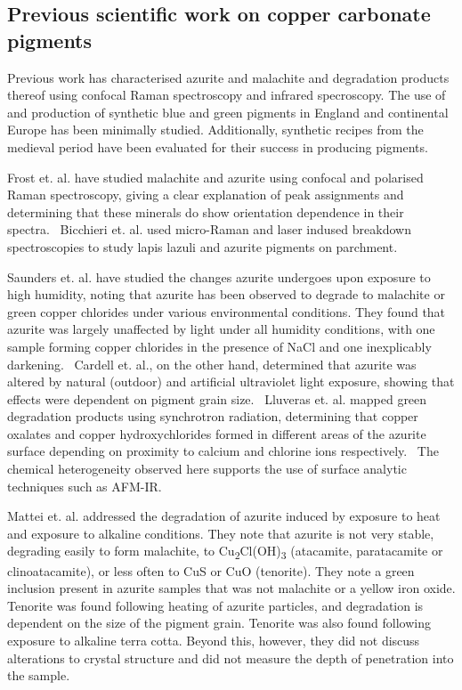 \subsection[Previous scientific work on copper carbonate pigments]{Previous scientific work on copper carbonate pigments}
\label{subsection1.1.5}

Previous work has characterised azurite and malachite and degradation products thereof using confocal Raman spectroscopy and infrared specroscopy. The use of and production of synthetic blue and green pigments in England and continental Europe has been minimally studied. Additionally, synthetic recipes from the medieval period have been evaluated for their success in producing pigments.

Frost et. al. have studied malachite and azurite using confocal and polarised Raman spectroscopy, giving a clear explanation of peak assignments and determining that these minerals do show orientation dependence in their spectra.~\autocite{Frost} Bicchieri et. al. used micro-Raman and laser indused breakdown spectroscopies to study lapis lazuli and azurite pigments on parchment.~\autocite{Bicchieri} 

Saunders et. al. have studied the changes azurite undergoes upon exposure to high humidity, noting that azurite has been observed to degrade to malachite or green copper chlorides under various environmental conditions. They found that azurite was largely unaffected by light under all humidity conditions, with one sample forming copper chlorides in the presence of NaCl and one inexplicably darkening.~\autocite{Saunders} Cardell et. al., on the other hand, determined that azurite was altered by natural (outdoor) and artificial ultraviolet light exposure, showing that effects were dependent on pigment grain size.~\autocite{Cardell} Lluveras et. al. mapped green degradation products using synchrotron radiation, determining that copper oxalates and copper hydroxychlorides formed in different areas of the azurite surface depending on proximity to calcium and chlorine ions respectively.~\autocite{Lluveras} The chemical heterogeneity observed here supports the use of surface analytic techniques such as AFM-IR. 

Mattei et. al. addressed the degradation of azurite induced by exposure to heat and exposure to alkaline conditions. They note that azurite is not very stable, degrading easily to form malachite, to Cu\textsubscript{2}Cl(OH)\textsubscript{3} (atacamite, paratacamite or clinoatacamite), or less often to CuS or CuO (tenorite). They note a green inclusion present in azurite samples that was not malachite or a yellow iron oxide. Tenorite was found following heating of azurite particles, and degradation is dependent on the size of the pigment grain. Tenorite was also found following exposure to alkaline terra cotta. Beyond this, however, they did not discuss alterations to crystal structure and did not measure the depth of penetration into the sample.~\autocite{Mattei} 

